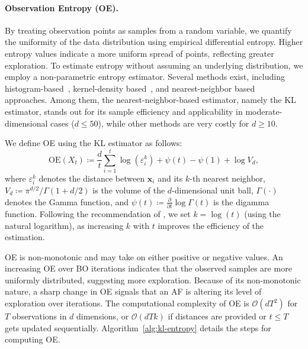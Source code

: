 \documentclass[accepted]{uai2025}
\begin{document}
\paragraph{Observation Entropy (OE).}
By treating observation points as samples from a random variable, we quantify the uniformity of the data distribution using empirical differential entropy. Higher entropy values indicate a more uniform spread of points, reflecting greater exploration. 
To estimate entropy without assuming an underlying distribution, we employ a non-parametric entropy estimator. Several methods exist, including histogram-based~\citep{gyorfi1987density}, kernel-density based~\citep{ahmad1976nonparametric}, and nearest-neighbor based~\citep{kozachenko1987statistical} approaches. 
Among them, the nearest-neighbor-based estimator, namely the \ac{KL} estimator, stands out for its sample efficiency and applicability in moderate-dimensional cases ($d\leq 50$), while other methods are very costly for $d\ge 10$.

We define \ac{OE} using the \ac{KL} estimator as follows:
\begin{equation}
\label{eq:kl-estimator}
\text{OE}(X_t) \coloneqq \frac{d}{t} \sum_{i=1}^{t} \log\left(\varepsilon_i^k\right) + \psi(t) - \psi(1) + \log V_d,
\end{equation}
where $\varepsilon_i^k$ denotes the distance between $\bm{x}_i$ and its $k$-th nearest neighbor, $V_d \coloneqq \pi^{d/2}/\Gamma(1+d/2)$ is the volume of the $d$-dimensional unit ball, $\Gamma(\cdot)$ denotes the Gamma function, and $\psi(t) \coloneqq \frac{\partial}{\partial t}\log \Gamma(t)$ is the digamma function. Following the recommendation of \citet{berrett2019efficient}, we set $k = \log(t)$ (using the natural logarithm), as increasing $k$ with $t$ improves the efficiency of the estimation.

\ac{OE} is non-monotonic and may take on either positive or negative values. 
An increasing \ac{OE} over \ac{BO} iterations indicates that the observed samples are more uniformly distributed, suggesting more exploration. 
Because of its non-monotonic nature, a sharp change in \ac{OE} signals that an \ac{AF} is altering its level of exploration over iterations. 
The computational complexity of \ac{OE} is $\mathcal{O}(dT^2)$ for $T$ observations in $d$ dimensions, or $\mathcal{O}(dTk)$ if distances are provided or $t\leq T$ gets updated sequentially. 
Algorithm~\ref{alg:kl-entropy} details the steps for computing \ac{OE}.
\end{document}
